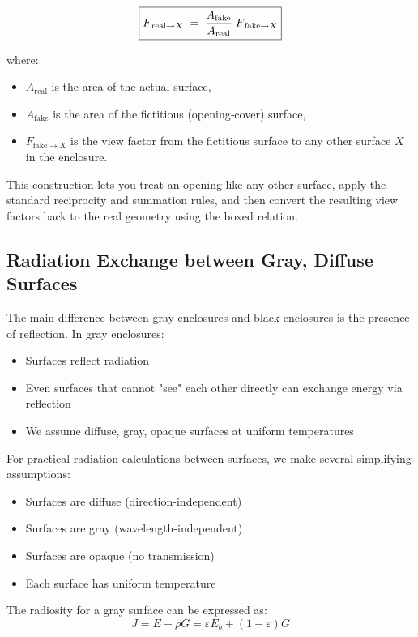 \[
\boxed{%
   F_{\,\text{real} \rightarrow X}
   \;=\;
   \frac{A_{\text{fake}}}{A_{\text{real}}}\;
   F_{\,\text{fake} \rightarrow X}
}
\]

where:
\begin{itemize}
    \item $A_{\text{real}}$ is the area of the actual surface,
    \item $A_{\text{fake}}$ is the area of the fictitious (opening‑cover) surface,
    \item $F_{\text{fake} \rightarrow X}$ is the view factor from the fictitious surface to any other surface $X$ in the enclosure.
\end{itemize}

This construction lets you treat an opening like any other surface, apply the standard reciprocity and summation rules, and then convert the resulting view factors back to the real geometry using the boxed relation.



\subsection*{Radiation Exchange between Gray, Diffuse Surfaces}
The main difference between gray enclosures and black enclosures is the presence of reflection. In gray enclosures:

\begin{itemize}
    \item Surfaces reflect radiation
    \item Even surfaces that cannot "see" each other directly can exchange energy via reflection
    \item We assume diffuse, gray, opaque surfaces at uniform temperatures
\end{itemize}
%
For practical radiation calculations between surfaces, we make several simplifying assumptions:

\begin{itemize}
    \item Surfaces are diffuse (direction-independent)
    \item Surfaces are gray (wavelength-independent)
    \item Surfaces are opaque (no transmission)
    \item Each surface has uniform temperature
\end{itemize}
%
The radiosity for a gray surface can be expressed as:
\[
J = E + \rho G = \varepsilon E_b + (1-\varepsilon) G
\]


